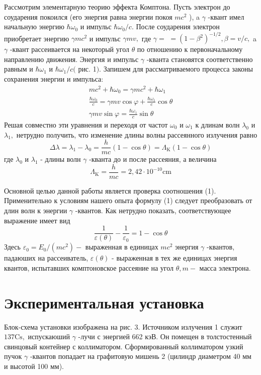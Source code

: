 \documentclass[a4paper, 12pt]{article}%
\begin{document}
Рассмотрим элементарную теорию эффекта Комптона. Пусть электрон до соударения покоился (его энергия равна энергии покоя $m c^{2}$ ), a $\gamma$ -квант имел начальную энергию $\hbar \omega_{0}$ и импульс $\hbar \omega_{0} / c .$ После соударения электрон приобретает энергию $\gamma m c^{2}$ и импульс $\gamma m v,$ где $\gamma=$ $=\left(1-\beta^{2}\right)^{-1 / 2}, \beta=v / c,$ a $\gamma$ -квант рассеивается на некоторый угол $\theta$ по отношению к первоначальному направлению движения. Энергия и импульс $\gamma$ -кванта становятся соответственно равным и $\hbar \omega_{1}$ и $\hbar \omega_{1} / c($ рис. 1$)$. Запишем для рассматриваемого процесса законы сохранения энергии и импульса:
$$
\begin{array}{c}
m c^{2}+\hbar \omega_{0}=\gamma m c^{2}+\hbar \omega_{1} \\
\frac{\hbar \omega_{0}}{c}=\gamma m v \cos \varphi+\frac{\hbar \omega_{1}}{c} \cos \theta \\
\gamma m v \sin \varphi=\frac{\hbar \omega_{1}}{c} \sin \theta
\end{array}
$$
Решая совместно эти уравнения и переходя от частот $\omega_{0}$ и $\omega_{1}$ к длинам волн $\lambda_{0}$ и $\lambda_{1},$ нетрудно получить, что изменение длины волны рассеянного излучения равно
\begin{equation}
\Delta \lambda=\lambda_{1}-\lambda_{0}=\frac{h}{m c}(1-\cos \theta)=\Lambda_{\mathrm{K}}(1-\cos \theta)
\end{equation}
где $\lambda_{0}$ и $\lambda_{1}$ - длины волн $\gamma$ -кванта до и после рассеяния, а величина
$$
\Lambda_{\mathrm{K}}=\frac{h}{m c}=2,42 \cdot 10^{-10} \mathrm{cm}
$$

Основной целью данной работы является проверка соотношения
(1). Применительно к условиям нашего опыта формулу
(1) следует преобразовать от длин волн к энергии $\gamma$ -квантов. Как нетрудно показать, соответствующее выражение имеет вид
\begin{equation}
\frac{1}{\varepsilon(\theta)}-\frac{1}{\varepsilon_{0}}=1-\cos \theta
\end{equation}
Здесь $\varepsilon_{0}=E_{0} /\left(m c^{2}\right)-$ выраженная в единицах $m c^{2}$ энергия $\gamma$ -квантов, падаюших на рассеиватель, $\varepsilon(\theta)$ - выраженная в тех же единицах энергия квантов, испытавших комптоновское рассеяние на угол $\theta, m-$ масса электрона.


\section{Экспериментальная установка}
Блок-схема установки изображена на рис. $3 .$ Источником излучения 1 служит $137 \mathrm{Cs},$ испускаюший $\gamma$ -лучи с энергией 662 кэВ. Он помещен в толстостенный свинцовый контейнер с коллиматором. Сформированный коллиматором узкий пучок $\gamma$ -квантов попадает на графитовую мишень 2 (цилиндр диаметром 40 мм и высотой 100 мм).
\end{document}
